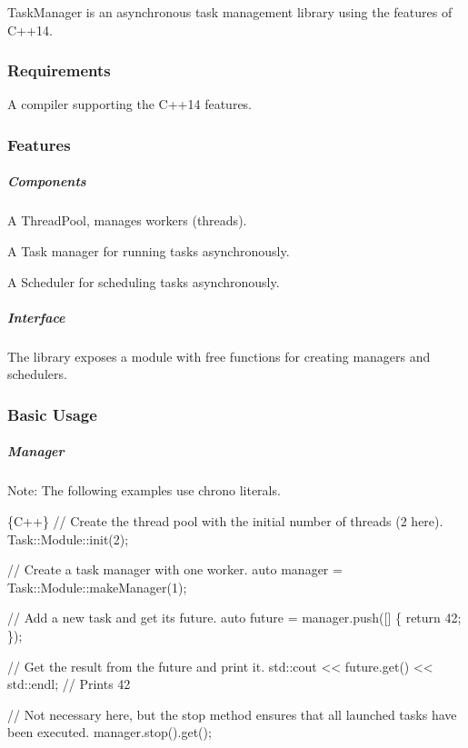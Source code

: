

\href{https://travis-ci.org/Tastyep/TaskManager}{\tt }

Task\+Manager is an asynchronous task management library using the features of C++14.

\subsubsection*{Requirements}

A compiler supporting the C++14 features.

\subsubsection*{Features}

\subparagraph*{Components}


\begin{DoxyItemize}
\item A Thread\+Pool, manages workers (threads).
\item A Task manager for running tasks asynchronously.
\item A Scheduler for scheduling tasks asynchronously.
\end{DoxyItemize}

\subparagraph*{Interface}


\begin{DoxyItemize}
\item The library exposes a module with free functions for creating managers and schedulers.
\end{DoxyItemize}

\subsubsection*{Basic Usage}

\subparagraph*{Manager}

Note\+: The following examples use chrono literals.


\begin{DoxyCode}
\{C++\}
// Create the thread pool with the initial number of threads (2 here).
Task::Module::init(2);

// Create a task manager with one worker.
auto manager = Task::Module::makeManager(1);

// Add a new task and get its future.
auto future = manager.push([] \{ return 42; \});

// Get the result from the future and print it.
std::cout << future.get() << std::endl; // Prints 42

// Not necessary here, but the stop method ensures that all launched tasks have been executed.
manager.stop().get();
\end{DoxyCode}


